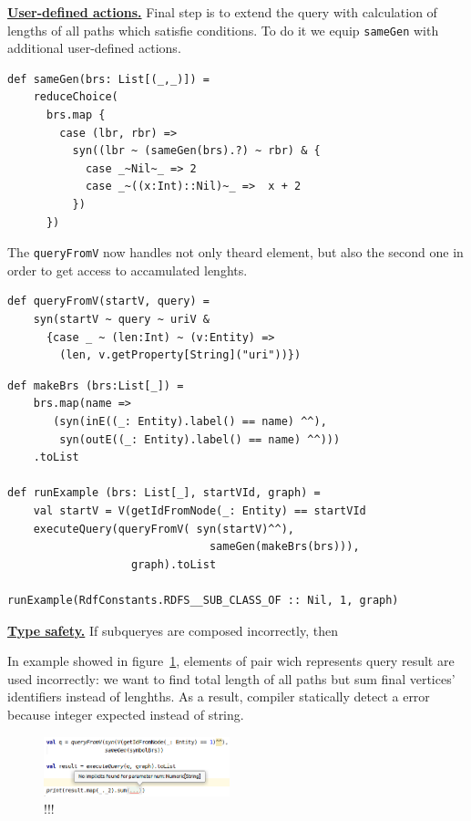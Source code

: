 \underline{\textbf{User-defined actions.}}
Final step is to extend the query with calculation of lengths of all paths which satisfie conditions.
To do it we equip \verb|sameGen| with additional user-defined actions.

\begin{lstlisting}
def sameGen(brs: List[(_,_)]) =
    reduceChoice(
      brs.map {
        case (lbr, rbr) =>
          syn((lbr ~ (sameGen(brs).?) ~ rbr) & {
            case _~Nil~_ => 2
            case _~((x:Int)::Nil)~_ =>  x + 2
          })
      })
\end{lstlisting}

The \verb|queryFromV| now handles not only theard element, but also the second one in order to get access to accamulated lenghts.

\begin{lstlisting}
def queryFromV(startV, query) =
    syn(startV ~ query ~ uriV &
      {case _ ~ (len:Int) ~ (v:Entity) =>
        (len, v.getProperty[String]("uri"))})
\end{lstlisting}

\begin{lstlisting}
def makeBrs (brs:List[_]) =
    brs.map(name =>
       (syn(inE((_: Entity).label() == name) ^^),
        syn(outE((_: Entity).label() == name) ^^)))
    .toList
    
def runExample (brs: List[_], startVId, graph) =
    val startV = V(getIdFromNode(_: Entity) == startVId
    executeQuery(queryFromV( syn(startV)^^),
                               sameGen(makeBrs(brs))),
                   graph).toList

runExample(RdfConstants.RDFS__SUB_CLASS_OF :: Nil, 1, graph)
\end{lstlisting}



\underline{\textbf{Type safety.}}
If subqueryes are composed incorrectly, then

In example showed in figure~\ref{fig:types}, elements of pair wich represents query result are used incorrectly: we want to find total length of all paths but sum final vertices' identifiers instead of lenghths.
As a result, compiler statically detect a error because integer expected instead of string.

\begin{figure}[ht]
   \includegraphics[width=0.48\textwidth]{pictures/image.png}
   \caption{!!!}
   \label{fig:types}
\end{figure}


